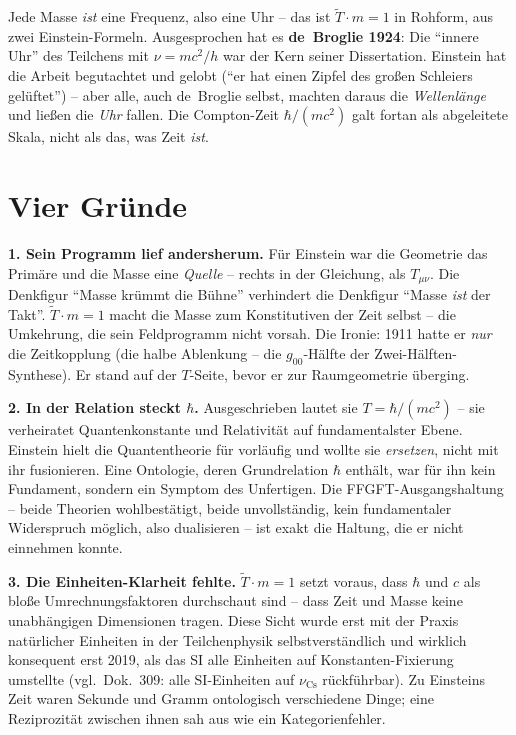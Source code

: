 \documentclass[11pt]{report}
\begin{document}
Jede Masse \emph{ist} eine Frequenz, also eine Uhr -- das ist
$\tilde T \cdot m = 1$ in Rohform, aus zwei Einstein-Formeln.
Ausgesprochen hat es \textbf{de~Broglie 1924}: Die
\enquote{innere Uhr} des Teilchens mit $\nu = mc^2/h$ war der Kern
seiner Dissertation. Einstein hat die Arbeit begutachtet und
gelobt (\enquote{er hat einen Zipfel des großen Schleiers
gelüftet}) -- aber alle, auch de~Broglie selbst, machten daraus die
\emph{Wellenlänge} und ließen die \emph{Uhr} fallen. Die
Compton-Zeit $\hbar/(mc^2)$ galt fortan als abgeleitete Skala,
nicht als das, was Zeit \emph{ist}.

\section{Vier Gründe}

\textbf{1. Sein Programm lief andersherum.} Für Einstein war die
Geometrie das Primäre und die Masse eine \emph{Quelle} -- rechts in
der Gleichung, als $T_{\mu\nu}$. Die Denkfigur \enquote{Masse
krümmt die Bühne} verhindert die Denkfigur \enquote{Masse
\emph{ist} der Takt}. $\tilde T \cdot m = 1$ macht die Masse zum
Konstitutiven der Zeit selbst -- die Umkehrung, die sein
Feldprogramm nicht vorsah. Die Ironie: 1911 hatte er \emph{nur} die
Zeitkopplung (die halbe Ablenkung -- die $g_{00}$-Hälfte der
Zwei-Hälften-Synthese). Er stand auf der $T$-Seite, bevor er zur
Raumgeometrie überging.

\textbf{2. In der Relation steckt $\hbar$.} Ausgeschrieben lautet
sie $T = \hbar/(mc^2)$ -- sie verheiratet Quantenkonstante und
Relativität auf fundamentalster Ebene. Einstein hielt die
Quantentheorie für vorläufig und wollte sie \emph{ersetzen}, nicht
mit ihr fusionieren. Eine Ontologie, deren Grundrelation $\hbar$
enthält, war für ihn kein Fundament, sondern ein Symptom des
Unfertigen. Die FFGFT-Ausgangshaltung -- beide Theorien
wohlbestätigt, beide unvollständig, kein fundamentaler Widerspruch
möglich, also dualisieren -- ist exakt die Haltung, die er nicht
einnehmen konnte.

\textbf{3. Die Einheiten-Klarheit fehlte.} $\tilde T \cdot m = 1$
setzt voraus, dass $\hbar$ und $c$ als bloße Umrechnungsfaktoren
durchschaut sind -- dass Zeit und Masse keine unabhängigen
Dimensionen tragen. Diese Sicht wurde erst mit der Praxis
natürlicher Einheiten in der Teilchenphysik selbstverständlich und
wirklich konsequent erst 2019, als das SI alle Einheiten auf
Konstanten-Fixierung umstellte (vgl.\ Dok.~309: alle SI-Einheiten
auf $\nu_\text{Cs}$ rückführbar). Zu Einsteins Zeit waren Sekunde
und Gramm ontologisch verschiedene Dinge; eine Reziprozität
zwischen ihnen sah aus wie ein Kategorienfehler.
\end{document}
